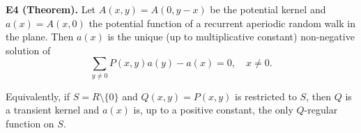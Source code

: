 \textbf{E4 (Theorem).} Let $A(x,y) = A(0,y-x)$ be the potential kernel and $a(x) = A(x,0)$ the potential function of a recurrent aperiodic random walk in the plane. Then $a(x)$ is the unique (up to multiplicative constant) non-negative solution of
$$\sum_{y \neq 0} P(x,y)a(y) - a(x) = 0, \quad x \neq 0.$$

Equivalently, if $S = R \setminus \{0\}$ and $Q(x,y) = P(x,y)$ is restricted to $S$, then $Q$ is a transient kernel and $a(x)$ is, up to a positive constant, the only $Q$-regular function on $S$.
